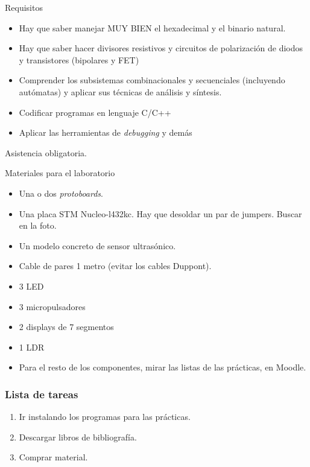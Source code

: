 \documentclass[a4paper]{book}
\begin{document}
Requisitos

\begin{itemize}
	\item Hay que saber manejar MUY BIEN el hexadecimal y el binario natural.
	\item Hay que saber hacer divisores resistivos y circuitos de polarización de diodos y transistores (bipolares y FET)
	\item Comprender los subsistemas combinacionales y secuenciales (incluyendo autómatas) y aplicar sus técnicas de análisis y síntesis.
	\item Codificar programas en lenguaje C/C++
	\item Aplicar las herramientas de \textit{debugging} y demás
\end{itemize}

Asistencia obligatoria.

Materiales para el laboratorio
\begin{itemize}
	\item Una o dos \textit{protoboards}.
	\item Una placa STM Nucleo-l432kc. Hay que desoldar un par de jumpers. Buscar en la foto.
	\item Un modelo concreto de sensor ultrasónico.
	\item Cable de pares 1 metro (evitar los cables Duppont).
	\item 3 LED
	\item 3 micropulsadores
	\item 2 displays de 7 segmentos
	\item 1 LDR
	\item Para el resto de los componentes, mirar las listas de las prácticas, en Moodle.
\end{itemize}

\subsubsection{Lista de tareas} \vspace{\parskip}
\begin{enumerate}
	\item Ir instalando los programas para las prácticas.
	\item Descargar libros de bibliografía.
	\item Comprar material.
\end{enumerate}
\newpage

\setlength{\parskip}{0em}
\tableofcontents
\setlength{\parskip}{0.5em}
\end{document}
